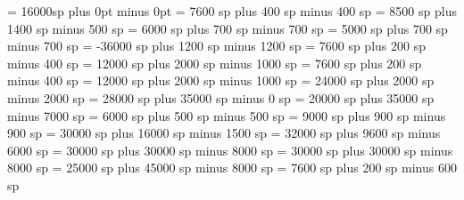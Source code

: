 
\greadditionallineswidth = 16000sp
\grezerowidthspace=0pt plus 0pt minus 0pt
\greinterglyphspace = 7600 sp plus 400 sp minus 400 sp
\grealterationspace = 8500 sp plus 1400 sp minus 500 sp
\greclefflatspace = 6000 sp plus 700 sp minus 700 sp
\grebeforechoralsignspace = 5000 sp plus 700 sp minus 700 sp
\grebeforealterationspace = -36000 sp plus 1200 sp minus 1200 sp
\greinterelementspace = 7600 sp plus 200 sp minus 400 sp
\grelargerspace = 12000 sp plus 2000 sp minus 1000 sp
\grenabcinterelementspace = 7600 sp plus 200 sp minus 400 sp
\grenabclargerspace = 12000 sp plus 2000 sp minus 1000 sp
\greglyphspace = 24000 sp plus 2000 sp minus 2000 sp
\greintersyllablespace= 28000 sp plus 35000 sp minus 0 sp
\grespacebeforecusto = 20000 sp plus 35000 sp minus 7000 sp
\grespacebeforesigns= 6000 sp plus 500 sp minus 500 sp
\grespaceaftersigns= 9000 sp plus 900 sp minus 900 sp
\grespaceafterlineclef = 30000 sp plus 16000 sp minus 1500 sp
\greinterwordspacenotes = 32000 sp plus 9600 sp minus 6000 sp
\greinterwordspacenotestext = 30000 sp plus 30000 sp minus 8000 sp
\greinterwordspacetextnotes = 30000 sp plus 30000 sp minus 8000 sp
\greinterwordspacetext = 25000 sp plus 45000 sp minus 8000 sp
\grebitrivirspace = 7600 sp plus 200 sp minus 600 sp
